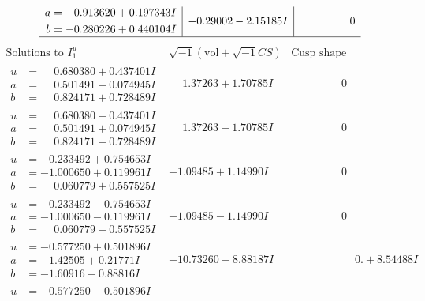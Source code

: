 \documentclass[1p]{elsarticle_modified}
\theoremstyle{definition}
\newcommand{\I}{\sqrt{-1}}
\begin{document}
$$\begin{array}{c|c|c}
\begin{aligned}
a &= -0.913620 + 0.197343 I \\
b &= -0.280226 + 0.440104 I\end{aligned}
 & -0.29002 - 2.15185 I & \phantom{-0.000000 } 0\\
 \hline 
 \end{array}$$\newpage$$\begin{array}{c|c|c}  
\text{Solutions to }I^u_{1}& \I (\text{vol} + \sqrt{-1}CS) & \text{Cusp shape}\\
 \hline 
\begin{aligned}
u &= \phantom{-}0.680380 + 0.437401 I \\
a &= \phantom{-}0.501491 - 0.074945 I \\
b &= \phantom{-}0.824171 + 0.728489 I\end{aligned}
 & \phantom{-}1.37263 + 1.70785 I & \phantom{-0.000000 } 0 \\ \hline\begin{aligned}
u &= \phantom{-}0.680380 - 0.437401 I \\
a &= \phantom{-}0.501491 + 0.074945 I \\
b &= \phantom{-}0.824171 - 0.728489 I\end{aligned}
 & \phantom{-}1.37263 - 1.70785 I & \phantom{-0.000000 } 0 \\ \hline\begin{aligned}
u &= -0.233492 + 0.754653 I \\
a &= -1.000650 + 0.119961 I \\
b &= \phantom{-}0.060779 + 0.557525 I\end{aligned}
 & -1.09485 + 1.14990 I & \phantom{-0.000000 } 0 \\ \hline\begin{aligned}
u &= -0.233492 - 0.754653 I \\
a &= -1.000650 - 0.119961 I \\
b &= \phantom{-}0.060779 - 0.557525 I\end{aligned}
 & -1.09485 - 1.14990 I & \phantom{-0.000000 } 0 \\ \hline\begin{aligned}
u &= -0.577250 + 0.501896 I \\
a &= -1.42505 + 0.21771 I \\
b &= -1.60916 - 0.88816 I\end{aligned}
 & -10.73260 - 8.88187 I & \phantom{-0.000000 -}0. + 8.54488 I \\ \hline\begin{aligned}
u &= -0.577250 - 0.501896 I \\

\end{aligned}
\end{array}$$
\end{document}
